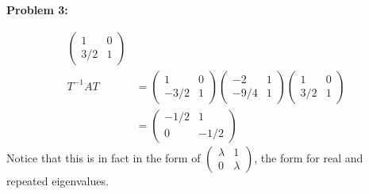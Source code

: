 \documentclass[11pt]{article}
\newenvironment{problem}[1]{\textbf{Problem #1: }}{\newpage}
\begin{document}
\begin{problem}{3}
\begin{enumerate}[label = (\alph*)]
\begin{align*}
\begin{pmatrix}
					1 & 0 \\
					3/2 & 1
				\end{pmatrix} \\
				T^{-1}AT &= \begin{pmatrix}
					1 & 0 \\
					-3/2 & 1
				\end{pmatrix}\begin{pmatrix}
					-2 & 1 \\
					-9/4 & 1
				\end{pmatrix}\begin{pmatrix}
					1 & 0 \\
					3/2 & 1
				\end{pmatrix} \\
				&= \begin{pmatrix}
					-1/2 & 1 \\
					0 & -1/2
				\end{pmatrix}
			\end{align*}
			Notice that this is in fact in the form of $\begin{pmatrix}
				\lambda & 1 \\
				0 & \lambda 
			\end{pmatrix}$, the form for real and repeated eigenvalues.
		\end{enumerate}

	\end{problem}
\end{document}
